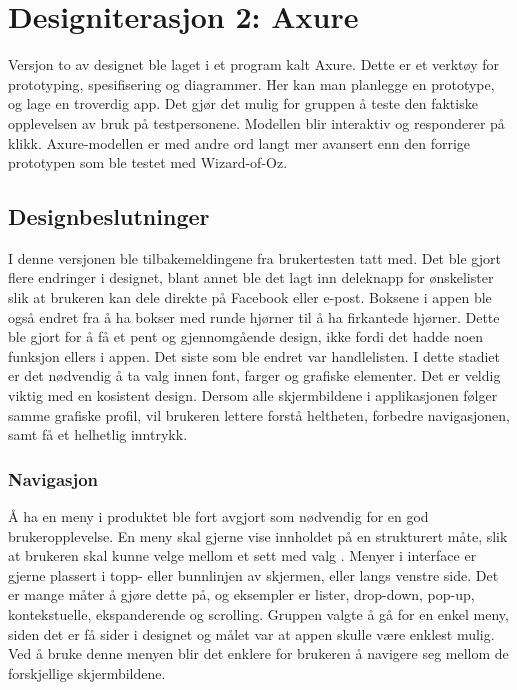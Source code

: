 \section{\textcolor[HTML]{D32F2F}{Designiterasjon 2: Axure}}
\label{design2}

Versjon to av designet ble laget i et program kalt Axure. Dette er et verktøy for prototyping, spesifisering og diagrammer. Her kan man planlegge en prototype, og lage en troverdig app. Det gjør det mulig for gruppen å teste den faktiske opplevelsen av bruk på testpersonene. Modellen blir interaktiv og responderer på klikk. Axure-modellen er med andre ord langt mer avansert enn den forrige prototypen som ble testet med Wizard-of-Oz.

\subsection{Designbeslutninger}
I denne versjonen ble tilbakemeldingene fra brukertesten tatt med. Det ble gjort flere endringer i designet, blant annet ble det lagt inn deleknapp for ønskelister slik at brukeren kan dele direkte på Facebook eller e-post. Boksene i appen ble også endret fra å ha bokser med runde hjørner til å ha firkantede hjørner. Dette ble gjort for å få et pent og gjennomgående design, ikke fordi det hadde noen funksjon ellers i appen. Det siste som ble endret var handlelisten. I dette stadiet er det nødvendig å ta valg innen font, farger og grafiske elementer. Det er veldig viktig med en kosistent design. Dersom alle skjermbildene i applikasjonen følger samme grafiske profil, vil brukeren lettere forstå heltheten, forbedre navigasjonen, samt få et helhetlig inntrykk.

\subsubsection{Navigasjon}
Å ha en meny i produktet ble fort avgjort som nødvendig for en god brukeropplevelse. En meny skal gjerne vise innholdet på en strukturert måte, slik at brukeren skal kunne velge mellom et sett med valg \cite[s.~166]{preece}. Menyer i interface er gjerne plassert i topp- eller bunnlinjen av skjermen, eller langs venstre side. Det er mange måter å gjøre dette på, og eksempler er lister, drop-down, pop-up, kontekstuelle, ekspanderende og scrolling. Gruppen valgte å gå for en enkel meny, siden det er få sider i designet og målet var at appen skulle være enklest mulig. Ved å bruke denne menyen blir det enklere for brukeren å navigere seg mellom de forskjellige skjermbildene. 

